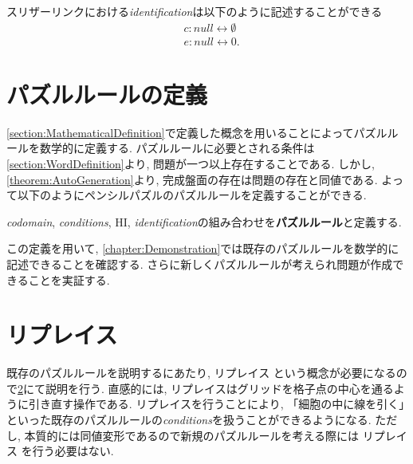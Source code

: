 \begin{example}\label{example:SlitherLinkIndentification}
  スリザーリンクにおける\textit{identification}は以下のように記述することができる
  \begin{align}
     & c\colon\textit{null}\leftrightarrow\emptyset \\
     & e\colon\textit{null}\leftrightarrow 0.
  \end{align}
\end{example}


\section{パズルルールの定義}\label{section:PuzzleRuleDefinition}
\cref{section:MathematicalDefinition}で定義した概念を用いることによってパズルルールを数学的に定義する. パズルルールに必要とされる条件は\cref{section:WordDefinition}より, 問題が一つ以上存在することである. しかし, \cref{theorem:AutoGeneration}より, 完成盤面の存在は問題の存在と同値である. よって以下のようにペンシルパズルのパズルルールを定義することができる.
\begin{definition}[パズルルール]\label{definition:PuzzleRule}
  \textit{codomain}, \textit{conditions}, HI, \textit{identification}の組み合わせを\textbf{パズルルール}と定義する.
\end{definition}
この定義を用いて, \cref{chapter:Demonstration}では既存のパズルルールを数学的に記述できることを確認する. さらに新しくパズルルールが考えられ問題が作成できることを実証する.

\section{リプレイス
 }\label{section:Replace}
既存のパズルルールを説明するにあたり, リプレイス
という概念が必要になるので\cref{section:Replace}にて説明を行う. 直感的には, リプレイスはグリッドを格子点の中心を通るように引き直す操作である.
リプレイスを行うことにより, 「細胞の中に線を引く」といった既存のパズルルールの\textit{conditions}を扱うことができるようになる.
ただし, 本質的には同値変形であるので新規のパズルルールを考える際には
リプレイス
を行う必要はない.


